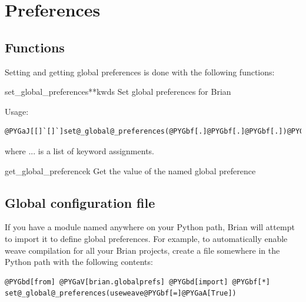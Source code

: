 \documentclass[letterpaper,10pt,english]{manual}
\begin{document}
\resetcurrentobjects
\hypertarget{--doc-reference-preferences}{}

\hypertarget{preferences}{}\section{Preferences}


\subsection{Functions}

Setting and getting global preferences is done with the following
functions:

\hypertarget{brian.set_global_preferences}{}\begin{funcdesc}{set\_global\_preferences}{**kwds}
Set global preferences for Brian

Usage:

\begin{Verbatim}[commandchars=@\[\]]
@PYGaJ[[]`[]`]set@_global@_preferences(@PYGbf[.]@PYGbf[.]@PYGbf[.])@PYGaJ[[]`[]`]
\end{Verbatim}

where ... is a list of keyword assignments.
\end{funcdesc}

\hypertarget{brian.get_global_preference}{}\begin{funcdesc}{get\_global\_preference}{k}
Get the value of the named global preference
\end{funcdesc}


\subsection{Global configuration file}

If you have a module named  anywhere on your Python path,
Brian will attempt to import it to define global preferences. For example, to
automatically enable weave compilation for all your Brian projects, create a
file  somewhere in the Python path with the following
contents:

\begin{Verbatim}[commandchars=@\[\]]
@PYGbd[from] @PYGaV[brian.globalprefs] @PYGbd[import] @PYGbf[*]
set@_global@_preferences(useweave@PYGbf[=]@PYGaA[True])
\end{Verbatim}
\end{document}

